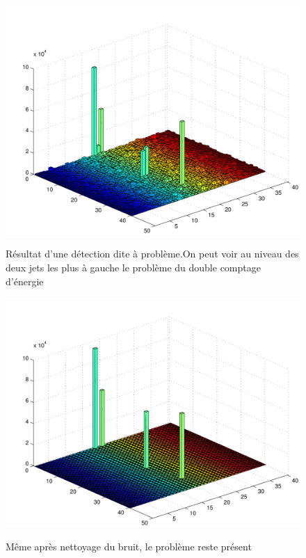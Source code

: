 \documentclass[11pt]{article}
\begin{document}
\begin{figure}[p]
\caption{Résultat d'une détection dite à problème.\newline On peut voir au
niveau des deux jets les plus à gauche le problème du double comptage d'énergie}
\includegraphics[scale=0.55]{images/mauvaisCasBrut-eps-converted-to.pdf}
\label{pasbonb}
\end{figure}
\begin{figure}[p]
\caption{Même après nettoyage du bruit, le problème reste présent}
\includegraphics[scale=0.55]{images/mauvaisCasNet-eps-converted-to.pdf}
\label{pasbonp}
\end{figure}
\end{document}
